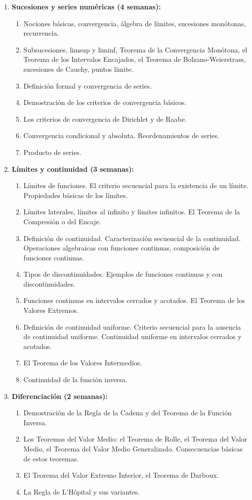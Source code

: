 \begin{refsection}
\begin{enumerate}
\item \textbf{Sucesiones y series numéricas (4 semanas):} 
\begin{enumerate}
    \item Nociones básicas, convergencia, álgebra de límites, sucesiones monótonas, recurrencia.
    \item Subsucesiones, limsup y liminf, Teorema de la Convergencia Monótona, el Teorema de los Intervalos Encajados, el Teorema de Bolzano-Weierstrass, sucesiones de Cauchy, puntos límite.
    \item Definición formal y convergencia de series.
    \item Demostración de los criterios de convergencia básicos.
    \item Los criterios de convergencia de Dirichlet y de Raabe.
    \item Convergencia condicional y absoluta. Reordenamientos de series.
    \item Producto de series.
\end{enumerate}

\item \textbf{Límites y continuidad (3 semanas):} 
\begin{enumerate}
    \item Límites de funciones. El criterio secuencial para la existencia de un límite. Propiedades básicas de los límites.
    \item Límites laterales, límites al infinito y límites infinitos. El Teorema de la Compresión o del Encaje.
    \item Definición de continuidad. Caracterización secuencial de la continuidad. Operaciones algebraicas con funciones continuas, composición de funciones continuas.
    \item Tipos de discontinuidades. Ejemplos de funciones continuas y con discontinuidades.
    \item Funciones continuas en intervalos cerrados y acotados. El Teorema de los Valores Extremos.
    \item Definición de continuidad uniforme. Criterio secuencial para la ausencia de continuidad uniforme. Continuidad uniforme en intervalos cerrados y acotados.
    \item El Teorema de los Valores Intermedios.
    \item Continuidad de la función inversa.
\end{enumerate}

\item \textbf{Diferenciación (2 semanas):} 
\begin{enumerate}
    \item Demostración de la Regla de la Cadena y del Teorema de la Función Inversa.
    \item Los Teoremas del Valor Medio: el Teorema de Rolle, el Teorema del Valor Medio, el Teorema del Valor Medio Generalizado. Consecuencias básicas de estos teoremas.
    \item El Teorema del Valor Extremo Interior, el Teorema de Darboux.
    \item La Regla de L'H\^{o}pital y sus variantes.
\end{enumerate}


\end{enumerate}
\end{refsection}
